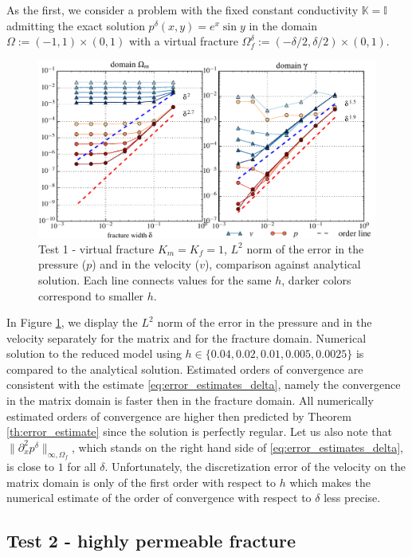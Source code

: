 \documentclass{llncs}
\def\prtl{\partial}
\def\tn#1{{\mathbb{#1}}}    %
\def\norm#1{\|#1\|}
\begin{document}
As the first, we consider a problem with the fixed constant conductivity $\tn K=\tn I$ 
admitting the exact solution $p^\delta(x,y)=e^x\sin y$ in the domain $\Omega:=(-1,1)\times(0,1)$
with a virtual fracture $\Omega_f^\delta:=(-\delta/2,\delta/2)\times(0,1)$.
\begin{figure}
\centering
\includegraphics[scale=0.6]{figures/plot_anal_exp_sin_color.pdf}
\caption{Test 1 - virtual fracture $K_m=K_f=1$, $L^2$ norm of the error in the pressure ($p$) and in the velocity ($v$), comparison against analytical solution.
Each line connects values for the same $h$, darker colors correspond to smaller $h$.}
\label{fig:exp_sin}
\end{figure}
In Figure \ref{fig:exp_sin}, we display the $L^2$ norm of the error in the pressure and in the velocity separately for the matrix and for the fracture domain. 
Numerical solution to the reduced model using $h\in \{0.04, 0.02, 0.01, 0.005, 0.0025\}$ is compared to the analytical solution. Estimated orders of convergence 
are consistent with the estimate \eqref{eq:error_estimates_delta}, namely the convergence in the matrix domain is faster then in the fracture domain. 
All numerically 
estimated orders of convergence are higher then predicted by Theorem \ref{th:error_estimate} since the solution is perfectly regular. Let us also note that 
$\norm{\prtl^2_x p^\delta}_{\infty,\Omega_f}$, which stands on the right hand side of \eqref{eq:error_estimates_delta}, is close to $1$ for all $\delta$.
Unfortunately, the discretization error of the velocity on the matrix domain is only of the first order with respect to $h$ 
which makes the numerical estimate of the order of convergence with respect to $\delta$ less precise.


\subsection{Test 2 - highly permeable fracture}
\end{document}
